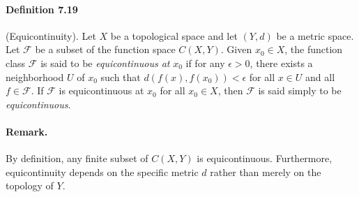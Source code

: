 \documentclass{article}
\numberwithin{equation}{section}
\theoremstyle{plain}
\theoremstyle{definition}
\begin{document}
\paragraph{Definition 7.19\label{def:7.19}} (Equicontinuity). Let $X$ be a topological space and let $(Y,d)$ be a metric space. Let $\mathcal{F}$ be a subset of the function space $C(X,Y)$. Given $x_0\in X$, the function class $\mathcal{F}$ is said to be \textit{equicontinuous at} $x_0$ if for any $\epsilon > 0$, there exists a neighborhood $U$ of $x_0$ such that $d(f(x),f(x_0)) < \epsilon$ for all $x\in U$ and all $f\in\mathcal{F}$. If $\mathcal{F}$ is equicontinuous at $x_0$ for all $x_0\in X$, then $\mathcal{F}$ is said simply to be \textit{equicontinuous}.

\paragraph{Remark.} By definition, any finite subset of $C(X,Y)$ is equicontinuous. Furthermore, equicontinuity depends on the specific metric $d$ rather than merely on the topology of $Y$.
\end{document}
